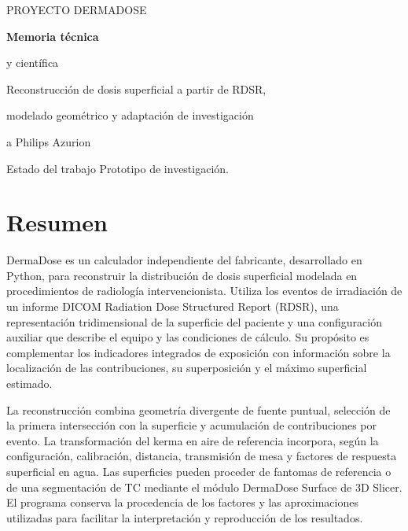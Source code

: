 \documentclass[11pt,a4paper,oneside]{report}
\begin{document}
\begin{titlepage}
\vspace*{.7cm}
{\color{white}\LARGE PROYECTO DERMADOSE\par}
\vspace{3.6cm}
{\Huge\bfseries\color{azul}Memoria técnica\par y científica \par}
\vspace{1cm}
{\Large Reconstrucción de dosis superficial a partir de RDSR,\par modelado geométrico y adaptación de investigación\par a Philips Azurion\par}
\vspace{1cm}
\vfill
\begin{criterio}{Estado del trabajo}
Prototipo de investigación.
\end{criterio}
\vspace{.5cm}
\end{titlepage}
\chapter*{Resumen}
DermaDose es un calculador independiente del fabricante, desarrollado en Python, para reconstruir la distribución de dosis superficial modelada en procedimientos de radiología intervencionista. Utiliza los eventos de irradiación de un informe DICOM Radiation Dose Structured Report (RDSR), una representación tridimensional de la superficie del paciente y una configuración auxiliar que describe el equipo y las condiciones de cálculo. Su propósito es complementar los indicadores integrados de exposición con información sobre la localización de las contribuciones, su superposición y el máximo superficial estimado.

La reconstrucción combina geometría divergente de fuente puntual, selección de la primera intersección con la superficie y acumulación de contribuciones por evento. La transformación del kerma en aire de referencia incorpora, según la configuración, calibración, distancia, transmisión de mesa y factores de respuesta superficial en agua. Las superficies pueden proceder de fantomas de referencia o de una segmentación de TC mediante el módulo DermaDose Surface de 3D Slicer. El programa conserva la procedencia de los factores y las aproximaciones utilizadas para facilitar la interpretación y reproducción de los resultados.
\end{document}
